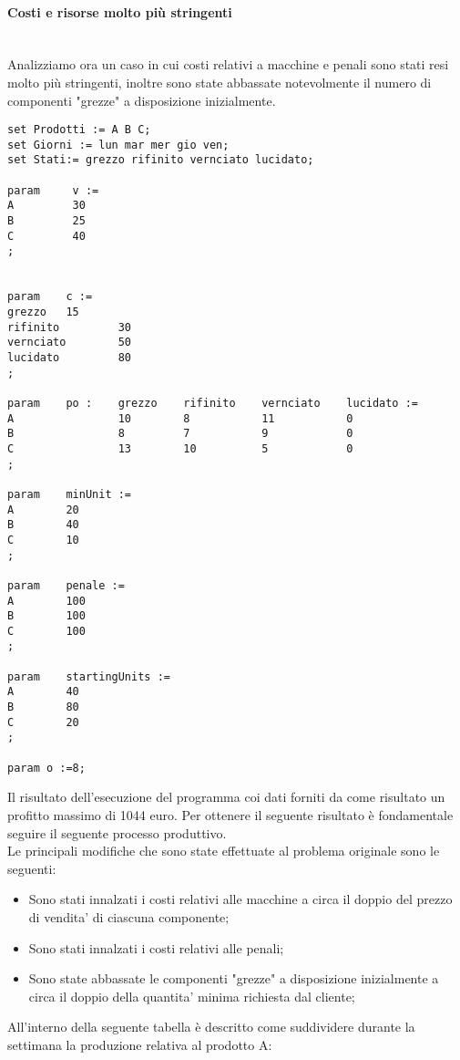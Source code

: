 \documentclass[12pt]{article}
\begin{document}
\paragraph{Costi e risorse molto più stringenti}\mbox{}\\
Analizziamo ora un caso in cui costi relativi a macchine e penali sono stati resi molto più stringenti, inoltre sono state abbassate notevolmente il numero di componenti "grezze" a disposizione inizialmente.
\begin{lstlisting}
set Prodotti := A B C;
set Giorni := lun mar mer gio ven;
set Stati:= grezzo rifinito vernciato lucidato;

param     v :=
A		  30
B		  25
C		  40
;


param    c :=
grezzo   15
rifinito		 30
vernciato		 50
lucidato		 80
;

param 	 po :    grezzo    rifinito    vernciato    lucidato :=
A                10        8    	   11   		0         
B                8         7    	   9    		0
C                13        10   	   5   		    0
;

param    minUnit :=
A		 20
B		 40
C		 10
;

param 	 penale :=
A		 100
B		 100
C		 100
;

param 	 startingUnits :=
A		 40
B	  	 80
C		 20
;

param o :=8;
\end{lstlisting}
Il risultato dell'esecuzione del programma coi dati forniti da come risultato un profitto massimo di 1044 euro.
Per ottenere il seguente risultato è fondamentale seguire il seguente processo produttivo.\\
Le principali modifiche che sono state effettuate al problema originale sono le seguenti:
\begin{itemize}
	\item Sono stati innalzati i costi relativi alle macchine a circa il doppio del prezzo di vendita' di ciascuna componente;
	\item Sono stati innalzati i costi relativi alle penali;
	\item Sono state abbassate le componenti "grezze" a disposizione inizialmente a circa il doppio della quantita' minima richiesta dal cliente;
\end{itemize}
All'interno della seguente tabella è descritto come suddividere durante la settimana la produzione relativa al prodotto A:
\end{document}
